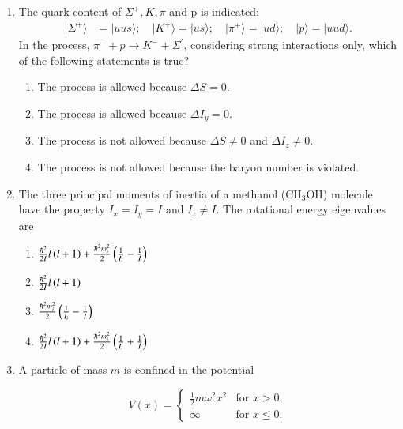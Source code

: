 \documentclass[journal]{IEEEtran}
\begin{document}
\begin{enumerate}
\item The quark content of $\Sigma^+, K, \pi$ and p is indicated:
\begin{align*}
|\Sigma^+\rangle &= |uus\rangle; \quad |K^+\rangle = |us\rangle; \quad |\pi^+\rangle = |ud\rangle; \quad |p\rangle = |uud\rangle.
\end{align*}
In the process, $\pi^{-} + p \rightarrow K^{-} + \Sigma^{\prime}$, considering strong interactions only, which of the following statements is true?

\begin{enumerate}
    \item The process is allowed because $\Delta S = 0$.
    \item The process is allowed because $\Delta I_{y} = 0$.
    \item The process is not allowed because $\Delta S \neq 0$ and $\Delta I_{z} \neq 0$.
    \item The process is not allowed because the baryon number is violated.
\end{enumerate}

\item The three principal moments of inertia of a methanol (CH$_3$OH) molecule have the property $I_x = I_y = I$ and $I_z \neq I$. The rotational energy eigenvalues are
\begin{multicols}{2}
\begin{enumerate}
    \item $\frac{\hbar^2}{2I}l\left(l+1\right) + \frac{\hbar^2 m_i^2}{2}\left(\frac{1}{I_i} - \frac{1}{I}\right)$\\
    \item $\frac{\hbar^2}{2I}l\left(l+1\right)$
    \item $\frac{\hbar^2 m_i^2}{2}\left(\frac{1}{I_i} - \frac{1}{I}\right)$\\
    \item $\frac{\hbar^2}{2I}l\left(l+1\right) + \frac{\hbar^2 m_i^2}{2}\left(\frac{1}{I_i} + \frac{1}{I}\right)$
\end{enumerate}
\end{multicols}
\item A particle of mass $m$ is confined in the potential 

\begin{equation*}
V(x) = \begin{cases}
\frac{1}{2}m\omega^2 x^2 & \text{for } x > 0, \\
\infty & \text{for } x \leq 0.
\end{cases}
\end{equation*}


\end{enumerate}
\end{document}
